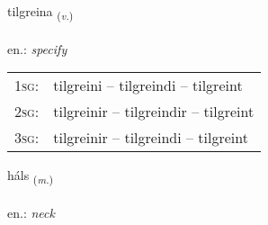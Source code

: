 \documentclass[frontgrid, backgrid]{flacards}\usepackage[]{graphicx}\usepackage[]{xcolor}
\begin{document}
\renewcommand{\flhead}{\vskip5pt \fboxsep=0pt {\small\bfseries\footnotesize Sagnorð | Verb}}
\renewcommand{\fcfoot}{\vskip5pt \fboxsep=0pt \hspace{2pt}{\small\bfseries\footnotesize 2K}}

\renewcommand{\blhead}{\vskip5pt {\small\bfseries\footnotesize Sagnorð | Verb }}
\renewcommand{\bcfoot}{\vskip5pt \hspace{2pt}{\small\bfseries\footnotesize 2K}}


{tilgreina \small{\textsubscript{(\textit{v.})}} \\[1ex] %
\textphonetic{[tʰɪlkreina]} \\
en.: \emph{specify} \\  [2ex]
\renewcommand*{\arraystretch}{0.8}
\begin{tabular}{p{1cm}l}
\textsc{1sg}: & tilgreini -- tilgreindi -- tilgreint \\ 
\textsc{2sg}: & tilgreinir -- tilgreindir -- tilgreint \\ 
\textsc{3sg}: & tilgreinir -- tilgreindi -- tilgreint \\ 
\end{tabular}
}

\renewcommand{\flhead}{\vskip5pt \fboxsep=0pt {\small\bfseries\footnotesize Nafnorð | Noun}}
\renewcommand{\fcfoot}{\vskip5pt \fboxsep=0pt \hspace{2pt}{\small\bfseries\footnotesize 2K}}

\renewcommand{\blhead}{\vskip5pt {\small\bfseries\footnotesize Nafnorð | Noun }}
\renewcommand{\bcfoot}{\vskip5pt \hspace{2pt}{\small\bfseries\footnotesize 2K}}


{háls \small{\textsubscript{(\textit{m.})}} \\[1ex] %
\textphonetic{[hauls]} \\
en.: \emph{neck} \\  [2ex]
\renewcommand*{\arraystretch}{0.8}
}
\end{document}
